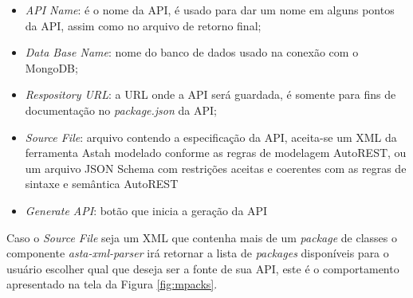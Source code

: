 \begin{itemize}
    \item \textit{API Name}: é o nome da API, é usado para dar um nome em alguns pontos da API, assim como no arquivo de retorno final;
    \item \textit{Data Base Name}: nome do banco de dados usado na conexão com o MongoDB;
    \item \textit{Respository URL}: a URL onde a API será guardada, é somente para fins de documentação no \textit{package.json} da API;
    \item \textit{Source File}: arquivo contendo a especificação da API, aceita-se um XML da ferramenta Astah modelado conforme as regras de modelagem AutoREST, ou um arquivo JSON Schema com restrições aceitas e coerentes com as regras de sintaxe e semântica AutoREST
    \item \textit{Generate API}: botão que inicia a geração da API
\end{itemize}

Caso o \textit{Source File} seja um XML que contenha mais de um \textit{package} de classes o componente \textit{asta-xml-parser} irá retornar a lista de \textit{packages} disponíveis para o usuário escolher qual que deseja ser a fonte de sua API, este é o comportamento apresentado na tela da Figura \ref{fig:mpacks}.

